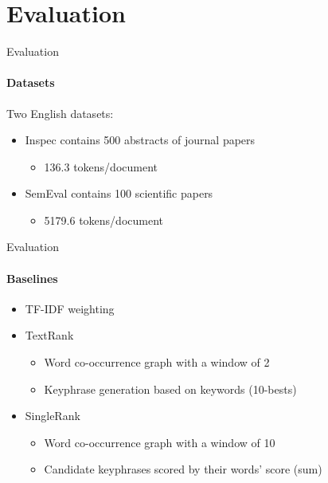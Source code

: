 \section{Evaluation}
  \begin{frame}{Evaluation}
    \framesubtitle{Datasets}

    Two English datasets:
    \begin{itemize}
      \item{Inspec contains 500 abstracts of journal papers}
      \begin{itemize}
        \item{136.3 tokens/document}
      \end{itemize}
      \item<2->{SemEval contains 100 scientific papers}
      \begin{itemize}
        \item{5179.6 tokens/document}
      \end{itemize}
    \end{itemize}

    \vfill

  \end{frame}

  \begin{frame}{Evaluation}
    \framesubtitle{Baselines}

    \begin{itemize}
      \item<+->{TF-IDF weighting}
      \item<+->{TextRank}
      \begin{itemize}
        \item{Word co-occurrence graph with a window of 2}
        \item{Keyphrase generation based on keywords (10-bests)}
      \end{itemize}
      \item<+->{SingleRank}
      \begin{itemize}
        \item{Word co-occurrence graph with a window of 10}
        \item{Candidate keyphrases scored by their words' score (sum)}
      \end{itemize}
    \end{itemize}
  \end{frame}

